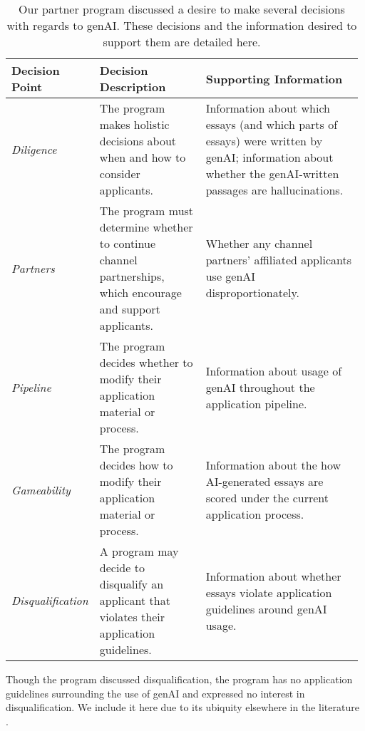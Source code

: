\begin{table}[htbp]
  \centering
  \caption{Our partner program discussed a desire to make several decisions with regards to genAI. These decisions and the information desired to support them are detailed here.}
  \label{tab:decisions}
    \begin{threeparttable}
  \begin{tabular}{ p{0.15\linewidth}p{0.33\linewidth}p{0.5\linewidth}}
      \toprule
      Decision Point & Decision Description & Supporting Information \\
      \midrule
      \emph{Diligence} & The program makes holistic decisions about when and how to consider applicants. & Information about which essays (and which parts of essays) were written by genAI; information about whether the genAI-written passages are hallucinations. \\ 
      \emph{Partners} & The program must determine whether to continue channel partnerships, which encourage and support applicants. & Whether any channel partners' affiliated applicants use genAI disproportionately. \\
      \emph{Pipeline} & The program decides whether to modify their application material or process. & Information about usage of genAI throughout the application pipeline. \\
      \emph{Gameability} & The program decides how to modify their application material or process. & Information about the how AI-generated essays are scored under the current application process. \\
      \midrule
      \emph{Disqualification} & A program may decide to disqualify an applicant that violates their application guidelines. & Information about whether essays violate application guidelines around genAI usage. \\
      \bottomrule
  \end{tabular}
  \begin{tablenotes}
      \small
      \item Though the program discussed disqualification, the program has no application guidelines surrounding the use of genAI and expressed no interest in disqualification. We include it here due to its ubiquity elsewhere in the literature \cite{liang_gpt_2023,mitchell_detectgpt_2023,tharindu_kumarage_stylometric_2023,kalpesh_krishna_paraphrasing_2023}.
  \end{tablenotes}
\end{threeparttable}
\end{table}


